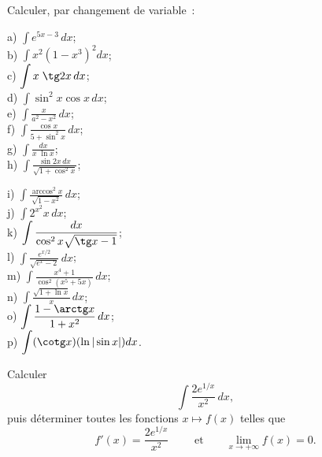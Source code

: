 \documentclass[12pt,french,oneside,a4paper]{memoir} %
\begin{document}
\begin{exo}
Calculer, par changement de variable~:\\

\hfill
\begin{minipage}[t]{6cm}
a) $\displaystyle{\int e^{5x-3}\,dx}$;\\[2mm]
b) $\displaystyle{\int x^2(1-x^3)^2dx}$;\\[2mm]
c) $\displaystyle{\int x\;\tg 2x\,dx}$;\\[2mm]%
d) $\displaystyle{\int \sin^2x\cos x\,dx}$;\\[2mm]
e) $\displaystyle{\int \frac{x}{a^2-x^2}\,dx}$;\\[2mm]
f) $\displaystyle{\int \frac{\cos x}{5+\sin^2x}\,dx}$;\\[2mm]
g) $\displaystyle{\int \frac{dx}{x\;\ln x}}$;\\[2mm]
h) $\displaystyle{\int \frac{\sin
2x\,dx}{\sqrt{1+\cos^2x}}}$;\\[2mm] \end{minipage}
\hfill
\begin{minipage}[t]{6cm}
i) $\displaystyle{\int \frac{\arccos^2x}{\sqrt{1-x^2}}\,dx}$;\\[2mm]
j) $\displaystyle{\int 2^{x^2}x\,dx}$;\\[2mm]
k) $\displaystyle{\int \frac{dx}{\cos^2x\sqrt{\tg
x-1}}}$;\\[2mm]
l) $\displaystyle{\int \frac{e^{x/2}}{\sqrt{e^x-2}}\,dx}$;\\[2mm]
m) $\displaystyle{\int \frac{x^4+1}{\cos^2(x^5+5x)}\,dx}$;\\[2mm]
n) $\displaystyle{\int \frac{\sqrt{1+\ln x}}{x}\,dx}$;\\[2mm]
o) $\displaystyle{\int \frac{1-\arctg x}{1+x^2}\,dx}$;\\[2mm]
p) $\displaystyle{\int (\cotg x)(\ln |\sin x|)dx}$.\\[2mm] \end{minipage} \hfill
\end{exo}

\begin{exo}
Calculer
\begin{equation*}
\displaystyle{\int\frac{2e^{1/x}}{x^2}\,dx},
\end{equation*}
puis déterminer toutes les fonctions $x\mapsto f(x)$ telles que
\begin{equation*}
\displaystyle{f'(x)=\frac{2e^{1/x}}{x^2}}\qquad\mbox{ et
}\qquad\displaystyle{\lim_{x\rightarrow+\infty}f(x)=0}.
\end{equation*}
\end{exo}
\end{document}
